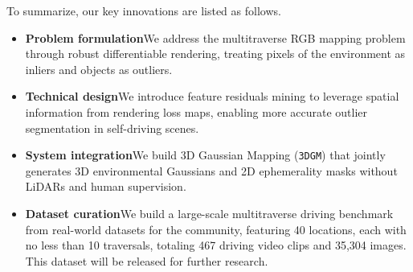 To summarize, our key innovations are listed as follows.
\begin{itemize}[leftmargin=1.3em]
    \item \textbf{{Problem formulation}}\quad We address the multitraverse RGB mapping problem through robust differentiable rendering, treating pixels of the environment as inliers and objects as outliers.

    \item \textbf{{Technical design}}\quad We introduce feature residuals mining to leverage spatial information from rendering loss maps, enabling more accurate outlier segmentation in self-driving scenes.

    \item \textbf{{System integration}}\quad We build 3D Gaussian Mapping (\texttt{3DGM}) that jointly generates 3D environmental Gaussians and 2D ephemerality masks without LiDARs and human supervision.

    \item \textbf{{Dataset curation}}\quad We build a large-scale multitraverse driving benchmark from real-world datasets for the community, featuring 40 locations, each with no less than 10 traversals, totaling 467 driving video clips and 35,304 images. This dataset will be released for further research.

\end{itemize}
